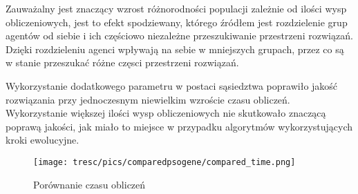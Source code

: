 Zauważalny jest znaczący wzrost różnorodności populacji zależnie od ilości wysp obliczeniowych, jest to efekt spodziewany, którego źródłem jest rozdzielenie grup agentów od siebie i ich częściowo niezależne przeszukiwanie przestrzeni rozwiązań. Dzięki rozdzieleniu agenci wpływają na sebie w mniejszych grupach, przez co są w stanie przeszukać różne częsci przestrzeni rozwiązań.

Wykorzystanie dodatkowego parametru w postaci sąsiedztwa poprawiło jakość rozwiązania przy jednoczesnym niewielkim wzroście czasu obliczeń. Wykorzystanie większej ilości wysp obliczeniowych nie skutkowało znaczącą poprawą jakości, jak miało to miejsce w przypadku algorytmów wykorzystujących kroki ewolucyjne. 



\begin{figure}[H]
\begin{center} 
\texttt{[image: tresc/pics/comparedpsogene/compared\_time.png]}
\caption{Porównanie czasu obliczeń}
\label{fig:compared_time}
\end{center}
\end{figure}




